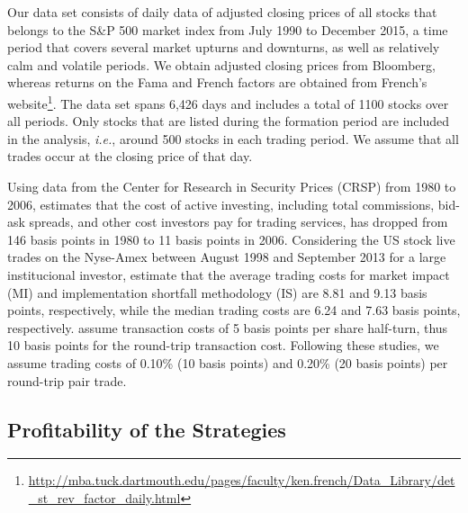 	Our data set consists of daily data of adjusted closing prices of all stocks that belongs to the S\&P 500 market index from July 1990 to December 2015, a time period that covers several market upturns and downturns, as well as relatively calm and volatile periods. We obtain adjusted closing prices from Bloomberg, whereas returns on the Fama and French factors are obtained from French's website\footnote{\url{http://mba.tuck.dartmouth.edu/pages/faculty/ken.french/Data_Library/det_st_rev_factor_daily.html}}. The data set spans 6,426 days and includes a total of 1100 stocks over all periods. Only stocks that are listed during the formation period are included in the analysis, \emph{i.e.}, around 500 stocks in each trading period. We assume that all trades occur at the closing price of that day.
	
	
	Using data from the Center for Research in Security Prices (CRSP) from 1980 to 2006, \citet*{french2008} estimates that the cost of active investing, including total commissions, bid-ask spreads, and other cost investors pay for trading services, has dropped from 146 basis points in 1980 to 11 basis points in 2006. Considering the US stock live trades on the Nyse-Amex between August 1998 and September 2013 for a large institucional investor, \citet*{fim15} estimate that the average trading costs for market impact (MI) and implementation shortfall methodology (IS) are 8.81 and 9.13 basis points, respectively, while the median trading costs are 6.24 and 7.63 basis points, respectively. \citet{avellaneda2010, stubinger2016,liu2017,stubinger2018} assume transaction costs of 5 basis points per share half-turn, thus 10 basis points for the round-trip transaction cost. Following these studies, we assume trading costs of 0.10\% (10 basis points) and 0.20\% (20 basis points) per round-trip pair trade.
	

	
	\vspace{0.3cm}
	
	
	\subsection{Profitability of the Strategies}
	
